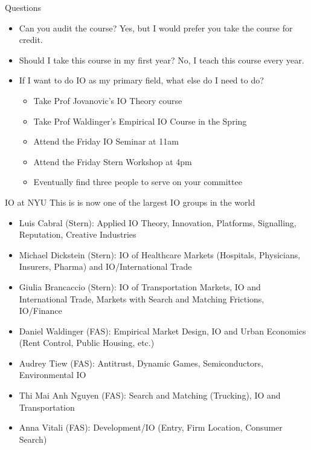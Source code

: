 \documentclass[aspectratio=169,11pt]{beamer}
\begin{document}
\begin{frame}{Questions}
\begin{itemize}
    \item Can you audit the course? Yes, but I would prefer you take the course for credit.
    \item Should I take this course in my first year? No, I teach this course every year.
    \item If I want to do IO as my primary field, what else do I need to do?
    \begin{itemize}
        \item Take Prof Jovanovic's IO Theory course
        \item Take Prof Waldinger's Empirical IO Course in the Spring
        \item Attend the Friday IO Seminar at 11am
        \item Attend the Friday Stern Workshop at 4pm
        \item Eventually find three people to serve on your committee
    \end{itemize}
\end{itemize}
\end{frame}



\begin{frame}{IO at NYU}
This is is now one of the largest IO groups in the world
\begin{itemize}
    \item Luis Cabral (Stern): Applied IO Theory, Innovation, Platforms, Signalling, Reputation, Creative Industries
    \item Michael Dickstein (Stern): IO of Healthcare Markets (Hospitals, Physicians, Insurers, Pharma) and IO/International Trade
    \item Giulia Brancaccio (Stern): IO of Transportation Markets, IO and International Trade, Markets with Search and Matching Frictions, IO/Finance
    \item Daniel Waldinger (FAS): Empirical Market Design, IO and Urban Economics (Rent Control, Public Housing, etc.)
    \item Audrey Tiew (FAS): Antitrust, Dynamic Games, Semiconductors, Environmental IO
    \item Thi Mai Anh Nguyen (FAS): Search and Matching (Trucking), IO and Transportation
    \item Anna Vitali (FAS): Development/IO (Entry, Firm Location, Consumer Search)
\end{itemize}
\end{frame}
\end{document}
